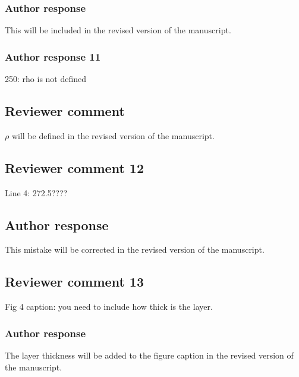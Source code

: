 \documentclass[11pt]{scrartcl}
\begin{document}
\subsubsection*{Author response}
This will be included in the revised version of the manuscript.

%

\subsubsection*{Author response 11}
250: rho is not defined

\subsection*{Reviewer comment}

$\rho$ will be defined in the revised version of the manuscript.


\subsection*{Reviewer comment 12}
Line 4: 272.5????

\subsection*{Author response}
This mistake will be corrected in the revised version of the manuscript.

\subsection*{Reviewer comment 13}
Fig 4 caption: you need to include how thick is the layer.

\subsubsection*{Author response}
The layer thickness will be added to the figure caption in the revised version
of the manuscript.



\end{document}
